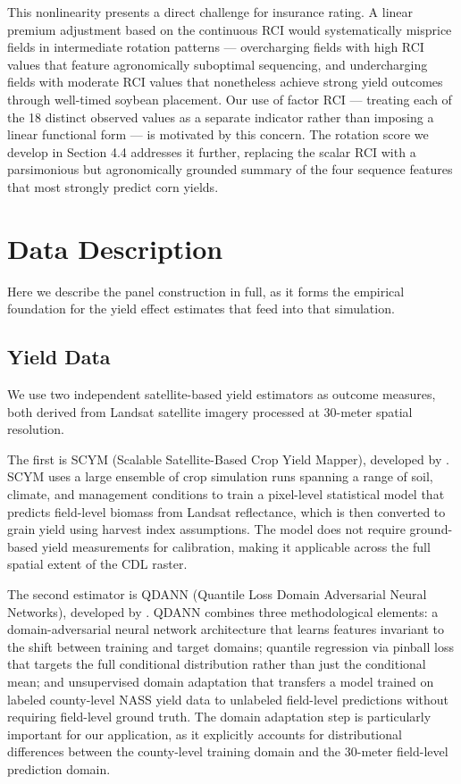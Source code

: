 \documentclass[11pt,letterpaper]{article}
\theoremstyle{remark}
\theoremstyle{plain}
\theoremstyle{definition}
\begin{document}
This nonlinearity presents a direct challenge for insurance rating. A linear premium adjustment based on the continuous RCI would systematically misprice fields in intermediate rotation patterns — overcharging fields with high RCI values that feature agronomically suboptimal sequencing, and undercharging fields with moderate RCI values that nonetheless achieve strong yield outcomes through well-timed soybean placement. Our use of factor RCI — treating each of the 18 distinct observed values as a separate indicator rather than imposing a linear functional form — is motivated by this concern. The rotation score we develop in Section 4.4 addresses it further, replacing the scalar RCI with a parsimonious but agronomically grounded summary of the four sequence features that most strongly predict corn yields.

\section{\label{sec:data}Data Description}

Here we describe the panel construction in full, as it forms the empirical foundation for the yield effect estimates that feed into that simulation.

\subsection{\label{subsec:yield}Yield Data}
We use two independent satellite-based yield estimators as outcome measures, both derived from Landsat satellite imagery processed at 30-meter spatial resolution.

The first is SCYM (Scalable Satellite-Based Crop Yield Mapper), developed by \cite{lobell2015}. SCYM uses a large ensemble of crop simulation runs spanning a range of soil, climate, and management conditions to train a pixel-level statistical model that predicts field-level biomass from Landsat reflectance, which is then converted to grain yield using harvest index assumptions. The model does not require ground-based yield measurements for calibration, making it applicable across the full spatial extent of the CDL raster. 

The second estimator is QDANN (Quantile Loss Domain Adversarial Neural Networks), developed by \cite{Ma2024}. QDANN combines three methodological elements: a domain-adversarial neural network architecture that learns features invariant to the shift between training and target domains; quantile regression via pinball loss that targets the full conditional distribution rather than just the conditional mean; and unsupervised domain adaptation that transfers a model trained on labeled county-level NASS yield data to unlabeled field-level predictions without requiring field-level ground truth. The domain adaptation step is particularly important for our application, as it explicitly accounts for distributional differences between the county-level training domain and the 30-meter field-level prediction domain. 
\end{document}
